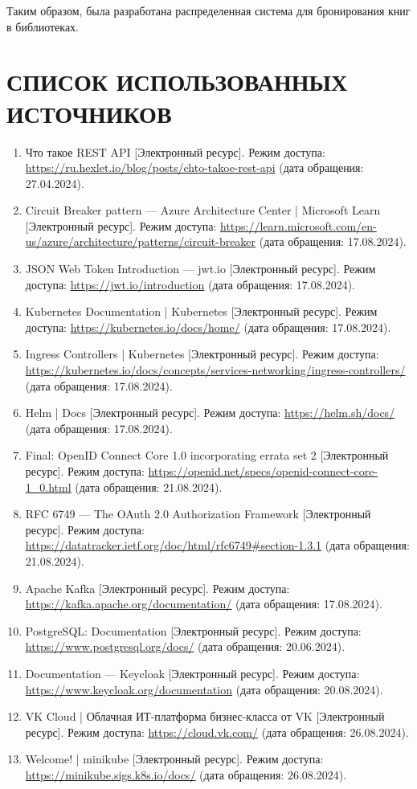 \documentclass[a4paper, 12pt]{article}
\begin{document}
\begin{large}
Таким образом, была разработана распределенная система для бронирования книг в библиотеках.

\newpage
\section*{СПИСОК ИСПОЛЬЗОВАННЫХ ИСТОЧНИКОВ}
\begin{enumerate}
    \item Что такое REST API [Электронный ресурс]. Режим доступа: \url{https://ru.hexlet.io/blog/posts/chto-takoe-rest-api} (дата обращения: 27.04.2024).
    \item Circuit Breaker pattern --- Azure Architecture Center | Microsoft Learn [Электронный ресурс]. Режим доступа: \url{https://learn.microsoft.com/en-us/azure/architecture/patterns/circuit-breaker} (дата обращения: 17.08.2024).
    \item JSON Web Token Introduction --- jwt.io [Электронный ресурс]. Режим доступа: \url{https://jwt.io/introduction} (дата обращения: 17.08.2024).
    \item Kubernetes Documentation | Kubernetes [Электронный ресурс]. Режим доступа: \url{https://kubernetes.io/docs/home/} (дата обращения: 17.08.2024).
    \item Ingress Controllers | Kubernetes [Электронный ресурс]. Режим доступа: \url{https://kubernetes.io/docs/concepts/services-networking/ingress-controllers/} (дата обращения: 17.08.2024).
    \item Helm | Docs [Электронный ресурс]. Режим доступа: \url{https://helm.sh/docs/} (дата обращения: 17.08.2024).
    \item Final: OpenID Connect Core 1.0 incorporating errata set 2 [Электронный ресурс]. Режим доступа: \url{https://openid.net/specs/openid-connect-core-1_0.html} (дата обращения: 21.08.2024).
    \item RFC 6749 --- The OAuth 2.0 Authorization Framework [Электронный ресурс]. Режим доступа: \url{https://datatracker.ietf.org/doc/html/rfc6749#section-1.3.1} (дата обращения: 21.08.2024).
    \item Apache Kafka [Электронный ресурс]. Режим доступа: \url{https://kafka.apache.org/documentation/} (дата обращения: 17.08.2024).
    \item PostgreSQL: Documentation [Электронный ресурс]. Режим доступа: \url{https://www.postgresql.org/docs/} (дата обращения: 20.06.2024).
    \item Documentation --- Keycloak [Электронный ресурс]. Режим доступа: \url{https://www.keycloak.org/documentation} (дата обращения: 20.08.2024).
    \item VK Cloud | Облачная ИТ-платформа бизнес-класса от VK [Электронный ресурс]. Режим доступа: \url{https://cloud.vk.com/} (дата обращения: 26.08.2024).
    \item Welcome! | minikube [Электронный ресурс]. Режим доступа: \url{https://minikube.sigs.k8s.io/docs/} (дата обращения: 26.08.2024).
\end{enumerate}

\end{large}
\end{document}
